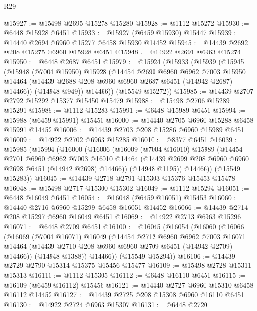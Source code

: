 \begin{lexlean}{R29}
\begin{coremodule}
@15927 := @15498 @2695 @15278 @15280
@15928 := @1112 @15272
@15930 := @6448 @15928 @6451
@15933 := @15927 (@6459 @15930) @15447
@15939 := @14440 @2694 @6960 @15277 @6458 @15930 @14452
@15945 := @14439 @2692 @208 @15275 @6960 @15928 @6451
@15948 := @14922 @2691 @6963 @15274
@15950 := @6448 @2687 @6451
@15979 := @15924
    (@15933
      (@15939
        (@15945
          (@15948
            (@7004 @15950)
            @15928
            (@14454
              @2690
              @6960
              @6962
              @7003
              @15950
              @14464
              (@14439 @2688 @208 @6960 @6960 @2687 @6451 (@14942 @2687) @14466))
            (@14948 @949))
          @14466))
      (@15549 @15272))
@15985 := @14439 @2707 @2792 @15292 @15377 @15450 @15479
@15988 := @15498 @2706 @15289 @15291
@15989 := @1112 @15283
@15991 := @6448 @15989 @6451
@15994 := @15988 (@6459 @15991) @15450
@16000 := @14440 @2705 @6960 @15288 @6458 @15991 @14452
@16006 := @14439 @2703 @208 @15286 @6960 @15989 @6451
@16009 := @14922 @2702 @6963 @15285
@16010 := @8377 @6451
@16039 := @15985
    (@15994
      (@16000
        (@16006
          (@16009
            (@7004 @16010)
            @15989
            (@14454
              @2701
              @6960
              @6962
              @7003
              @16010
              @14464
              (@14439 @2699 @208 @6960 @6960 @2698 @6451 (@14942 @2698) @14466))
            (@14948 @1195))
          @14466))
      (@15549 @15283))
@16045 := @14439 @2718 @2791 @15303 @15376 @15453 @15478
@16048 := @15498 @2717 @15300 @15302
@16049 := @1112 @15294
@16051 := @6448 @16049 @6451
@16054 := @16048 (@6459 @16051) @15453
@16060 := @14440 @2716 @6960 @15299 @6458 @16051 @14452
@16066 := @14439 @2714 @208 @15297 @6960 @16049 @6451
@16069 := @14922 @2713 @6963 @15296
@16071 := @6448 @2709 @6451
@16100 := @16045
    (@16054
      (@16060
        (@16066
          (@16069
            (@7004 @16071)
            @16049
            (@14454
              @2712
              @6960
              @6962
              @7003
              @16071
              @14464
              (@14439 @2710 @208 @6960 @6960 @2709 @6451 (@14942 @2709) @14466))
            (@14948 @1388))
          @14466))
      (@15549 @15294))
@16106 := @14439 @2729 @2790 @15314 @15375 @15456 @15477
@16109 := @15498 @2728 @15311 @15313
@16110 := @1112 @15305
@16112 := @6448 @16110 @6451
@16115 := @16109 (@6459 @16112) @15456
@16121 := @14440 @2727 @6960 @15310 @6458 @16112 @14452
@16127 := @14439 @2725 @208 @15308 @6960 @16110 @6451
@16130 := @14922 @2724 @6963 @15307
@16131 := @6448 @2720

\end{coremodule}
\end{lexlean}
